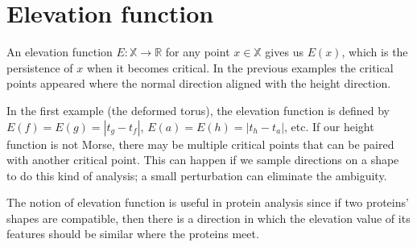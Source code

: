 \documentclass{article}
\begin{document}
\section{Elevation function}

An elevation function $E:\mathbb{X}\to\mathbb{R}$ for any point $x\in\mathbb{X}$ gives us $E(x)$, which is the persistence of $x$ when it becomes critical. In the previous examples the critical points appeared where the normal direction aligned with the height direction.

In the first example (the deformed torus), the elevation function is defined by $E(f)=E(g)=|t_g-t_f|$, $E(a)=E(h)=|t_h-t_a|$, etc. If our height function is not Morse, there may be multiple critical points that can be paired with another critical point. This can happen if we sample directions on a shape to do this kind of analysis; a small perturbation can eliminate the ambiguity.

The notion of elevation function is useful in protein analysis since if two proteins' shapes are compatible, then there is a direction in which the elevation value of its features should be similar where the proteins meet.
\end{document}
